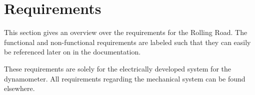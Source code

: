 \chapter{Requirements}
This section gives an overview over the requirements for the Rolling Road. The functional and non-functional requirements are labeled such that they can easily be referenced later on in the documentation.

These requirements are solely for the electrically developed system for the dynamometer. All requirements regarding the mechanical system can be found elsewhere. 


